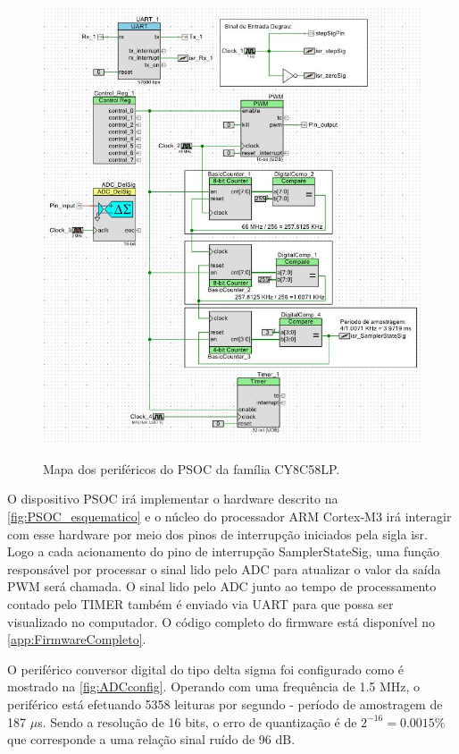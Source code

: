 \documentclass[
	article,			%
	11pt,				%
	oneside,			%
	a4paper,			%
	english,			%
	brazil,				%
	sumario=tradicional
	]{abntex2}
\begin{document}
\begin{figure}[htb!]
	\centering
	\caption{Mapa dos periféricos do PSOC da família CY8C58LP.}
	\includegraphics[scale=0.65]{./img/PSOC_esquematico.JPG}
	\label{fig:PSOC_esquematico}
\end{figure}

O dispositivo PSOC irá implementar o hardware descrito na \autoref{fig:PSOC_esquematico} e o núcleo do processador ARM Cortex-M3 irá interagir com esse hardware por meio dos pinos de interrupção iniciados pela sigla isr. 
Logo a cada acionamento do pino de interrupção SamplerStateSig, uma função responsável por processar o sinal lido pelo ADC para atualizar o valor da saída PWM será chamada.
O sinal lido pelo ADC junto ao tempo de processamento contado pelo TIMER também é enviado via UART para que possa ser visualizado no computador.
O código completo do firmware está disponível no \autoref{app:FirmwareCompleto}.

\pagebreak

O periférico conversor digital do tipo delta sigma foi configurado como é mostrado na \autoref{fig:ADCconfig}.
Operando com uma frequência de 1.5 MHz, o periférico está efetuando 5358 leituras por segundo - período de amostragem de 187 $\mu$s. 
Sendo a resolução de 16 bits, o erro de quantização é de $2^{-16} = 0.0015\%$ que corresponde a uma relação sinal ruído de 96 dB.
\end{document}
